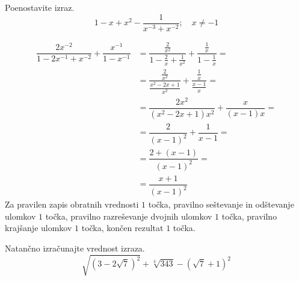 \documentclass[addpoints]{exam}
\begin{document}
\begin{questions}

        \question[5]
        Poenostavite izraz.
            $$1-x+x^2-\dfrac{1}{x^{-3}+x^{-2}}; \quad x\neq -1$$
    
            \begin{solution}[4cm]
                \begin{align*}
                    \dfrac{2x^{-2}}{1-2x^{-1}+x^{-2}}+\dfrac{x^{-1}}{1-x^{-1}} &= \dfrac{\frac{2}{x^2}}{1-\frac{2}{x}+\frac{1}{x^2}}+\dfrac{\frac{1}{x}}{1-\frac{1}{x}}= \\
                                                                            &= \dfrac{\frac{2}{x^2}}{\frac{x^2-2x+1}{x^2}}+\dfrac{\frac{1}{x}}{\frac{x-1}{x}}= \\
                                                                            &= \dfrac{2x^2}{(x^2-2x+1)x^2}+\dfrac{x}{(x-1)x}= \\
                                                                            &= \dfrac{2}{(x-1)^2}+\dfrac{1}{x-1}= \\
                                                                            &= \dfrac{2+(x-1)}{(x-1)^2}= \\
                                                                            &= \dfrac{x+1}{(x-1)^2}
                \end{align*}
                Za pravilen zapis obratnih vrednosti $1$ točka, pravilno seštevanje in odštevanje ulomkov $1$ točka, pravilno razreševanje dvojnih ulomkov $1$ točka, pravilno krajšanje ulomkov $1$ točka, končen rezultat $1$ točka.
            \end{solution}
    












    \newpage


    \question[5]
    Natančno izračunajte vrednost izraza.
    $$ \sqrt{\left(3-2\sqrt{7}\right)^2}+\sqrt[3]{343}-\left(\sqrt{7}+1\right)^2 $$


\end{questions}
\end{document}
